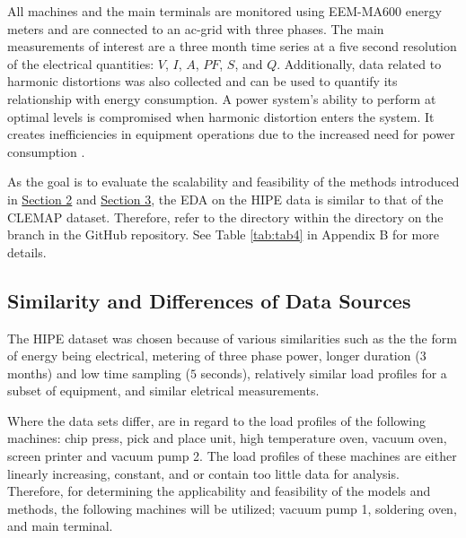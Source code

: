 All machines and the main terminals are monitored using EEM-MA600 energy meters and are connected to an ac-grid with three phases. The main measurements of interest are a three month time series at a five second resolution of the electrical quantities: $V$, $I$, $A$, $PF$, $S$, and $Q$. Additionally, data related to harmonic distortions was also collected and can be used to quantify its relationship with energy consumption. A power system’s ability to perform at optimal levels is compromised when harmonic distortion enters the system. It creates inefficiencies in equipment operations due to the increased need for power consumption \cite{noauthor_harmonic_2021}. 

As the goal is to evaluate the scalability and feasibility of the methods introduced in \hyperlink{section.2}{Section 2} and \hyperlink{section.3}{Section 3}, the EDA on the HIPE data is similar to that of the CLEMAP dataset. Therefore, refer to the  directory within the  directory on the  branch in the GitHub repository. See Table \ref{tab:tab4} in Appendix B for more details. 

\subsection{Similarity and Differences of Data Sources}

The HIPE dataset was chosen because of various similarities such as the the form of energy being electrical, metering of three phase power, longer duration ($3$ months) and low time sampling ($5$ seconds), relatively similar load profiles for a subset of equipment, and similar eletrical measurements. 

Where the data sets differ, are in regard to the load profiles of the following machines: chip press, pick and place unit, high temperature oven, vacuum oven, screen printer and vacuum pump 2. The load profiles of these machines are either linearly increasing, constant, and or contain too little data for analysis. Therefore, for determining the applicability and feasibility of the models and methods, the following machines will be utilized; vacuum pump 1, soldering oven, and main terminal.
